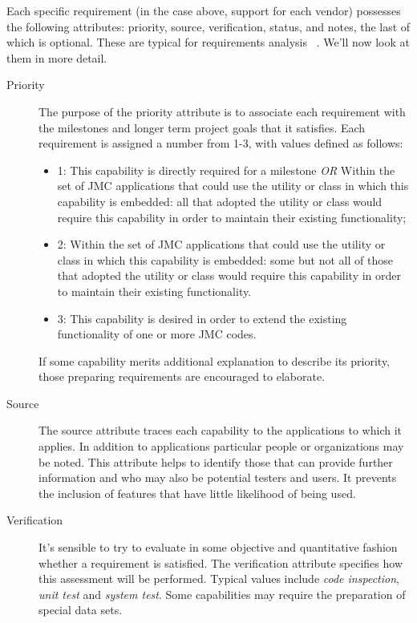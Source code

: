 
Each specific requirement (in the case above, support for each vendor) 
possesses the following attributes:  priority, source, verification, status, 
and notes, the last of which is optional.  These are typical for requirements
analysis ~\cite{wiegers}.  We'll now look at them in more detail.

\begin{description}
\item [Priority] The purpose of the priority attribute is to associate
each requirement with the milestones and longer term project goals that 
it satisfies.  Each requirement is assigned a number from 1-3, with
values defined as follows:
\begin{itemize}

\item 1:  This capability is directly required for a milestone {\it OR}
\newline Within the set of JMC applications that could use the 
utility or class in which this capability is embedded:
all that adopted the utility or class would require this 
capability in order to maintain their existing functionality;

\item 2: Within the set of JMC applications that could use the 
utility or class in which this capability is embedded:
some but not all of those that adopted the utility or class would 
require this capability in order to maintain their existing 
functionality.

\item 3:  This capability is desired in order to extend
the existing functionality of one or more JMC codes.

\end{itemize}

If some capability merits additional explanation to describe 
its priority, those preparing requirements are encouraged 
to elaborate.
 
\item [Source] The source attribute traces each capability
to the applications to which it applies.  In addition to applications
particular people or organizations may be noted.   This attribute 
helps to identify those that can provide further 
information and who may also be potential testers and users.  It
prevents the inclusion of features that have little likelihood of
being used.

\item [Verification] It's sensible to try to evaluate in some
objective and quantitative fashion whether a requirement is 
satisfied.  The verification attribute specifies how this assessment
will be performed.  Typical values include {\it code inspection}, 
{\it unit test} and {\it system test}.
Some capabilities may require the preparation of special data sets.


\end{description}
